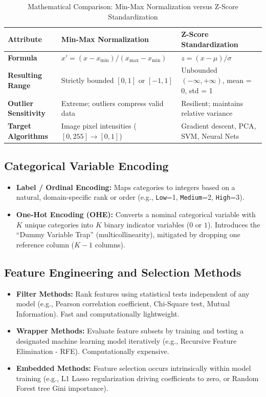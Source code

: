 \begin{table}[htbp]
\centering
\small
\caption{Mathematical Comparison: Min-Max Normalization versus Z-Score Standardization}
\label{tab:scaling_comparison}
\begin{tabularx}{\textwidth}{p{3.5cm}XX}
\toprule
\textbf{Attribute} & \textbf{Min-Max Normalization} & \textbf{Z-Score Standardization} \\
\midrule
\textbf{Formula} & $x' = (x - x_{\min}) / (x_{\max} - x_{\min})$ & $z = (x - \mu) / \sigma$ \\
\textbf{Resulting Range} & Strictly bounded $[0, 1]$ or $[-1, 1]$ & Unbounded $(-\infty, +\infty)$, mean = 0, std = 1 \\
\textbf{Outlier Sensitivity} & Extreme; outliers compress valid data & Resilient; maintains relative variance \\
\textbf{Target Algorithms} & Image pixel intensities ($[0, 255] \to [0, 1]$) & Gradient descent, PCA, SVM, Neural Nets \\
\bottomrule
\end{tabularx}
\end{table}

\subsection{Categorical Variable Encoding}
\begin{itemize}
    \item \textbf{Label / Ordinal Encoding:} Maps categories to integers based on a natural, domain-specific rank or order (e.g., \texttt{Low}=1, \texttt{Medium}=2, \texttt{High}=3).
    \item \textbf{One-Hot Encoding (OHE):} Converts a nominal categorical variable with $K$ unique categories into $K$ binary indicator variables ($0$ or $1$). Introduces the ``Dummy Variable Trap'' (multicollinearity), mitigated by dropping one reference column ($K-1$ columns).
\end{itemize}

\subsection{Feature Engineering and Selection Methods}
\begin{itemize}
    \item \textbf{Filter Methods:} Rank features using statistical tests independent of any model (e.g., Pearson correlation coefficient, Chi-Square test, Mutual Information). Fast and computationally lightweight.
    \item \textbf{Wrapper Methods:} Evaluate feature subsets by training and testing a designated machine learning model iteratively (e.g., Recursive Feature Elimination - RFE). Computationally expensive.
    \item \textbf{Embedded Methods:} Feature selection occurs intrinsically within model training (e.g., L1 Lasso regularization driving coefficients to zero, or Random Forest tree Gini importance).
\end{itemize}


